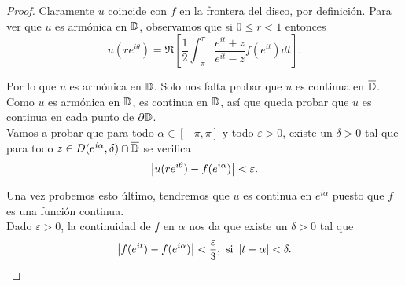 \begin{proof}
    Claramente $u$ coincide con $f$ en la frontera del disco, por definición. Para ver que $u$ es armónica en $\mathbb{D}$, observamos que si $0 \leq r < 1$ entonces
    \begin{equation*}
        u(re^{i \theta}) = \Re \left[ \dfrac{1}{2} \int_{-\pi}^{\pi} \dfrac{e^{it} + z}{e^{it} - z} f(e^{it}) dt  \right].
    \end{equation*}

    Por lo que $u$ es armónica en $\mathbb{D}$. Solo nos falta probar que $u$ es continua en $\overline{\mathbb{D}}$. Como $u$ es armónica en $\mathbb{D}$, es continua en $\mathbb{D}$, así que queda probar que $u$ es continua en cada punto de $\partial \mathbb{D}$. \\

    Vamos a probar que para todo $\alpha \in [- \pi, \pi]$ y todo $\varepsilon > 0$, existe un $\delta > 0$ tal que para todo $z \in D(e^{i \alpha}, \delta) \cap \overline{\mathbb{D}}$ se verifica
    \begin{equation*}
        \left\lvert u(re^{i \theta}) - f(e^{i \alpha})\right\rvert < \varepsilon.
    \end{equation*}

    Una vez probemos esto último, tendremos que $u$ es continua en $e^{i \alpha}$ puesto que $f$ es una función continua. \\

    Dado $\varepsilon > 0$, la continuidad de $f$ en $\alpha$ nos da que existe un $\delta > 0$ tal que
    \begin{equation*}
        \left\lvert f(e^{it}) - f(e^{i \alpha})\right\rvert < \frac{\varepsilon}{3}, \text{  si } \left\lvert t - \alpha\right\rvert < \delta.
    \end{equation*}


\end{proof}
